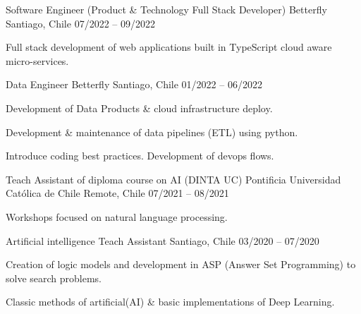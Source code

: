 \begin{cventries}
\newline
\cventry
{Software Engineer (Product \& Technology Full Stack Developer)} %
{Betterfly} %
{Santiago, Chile} %
{07/2022 – 09/2022} %
{
  \begin{cvitems} %
    \item {Full stack development of web applications built in TypeScript cloud aware micro-services.}
  \end{cvitems}
}
\newline
\cventry
  {Data Engineer} %
  {Betterfly} %
  {Santiago, Chile} %
  {01/2022 – 06/2022} %
  {
    \begin{cvitems} %
      \item {Development of Data Products \& cloud infrastructure deploy.}
      \item {Development \& maintenance of data pipelines (ETL) using python.}
      \item {Introduce coding best practices. Development of devops flows.}
    \end{cvitems}
  }
  \newline
\cventry
  {Teach Assistant of diploma course on AI (DINTA UC)} %
  {Pontificia Universidad Católica de Chile} %
  {Remote, Chile} %
  {07/2021 – 08/2021} %
  {
    \begin{cvitems} %
      \item {Workshops focused on natural language processing.}
    \end{cvitems}
  }
  \newline
  \cventry
    {Artificial intelligence Teach Assistant} %
    {} %
    {Santiago, Chile} %
    {03/2020 – 07/2020} %
    {
      \begin{cvitems} %
        \item {Creation of logic models and development in ASP (Answer Set Programming) to solve search problems.}
        \item {Classic methods of artificial(AI) \& basic implementations of Deep Learning.}
      \end{cvitems}
    }
    \newline


\end{cventries}
